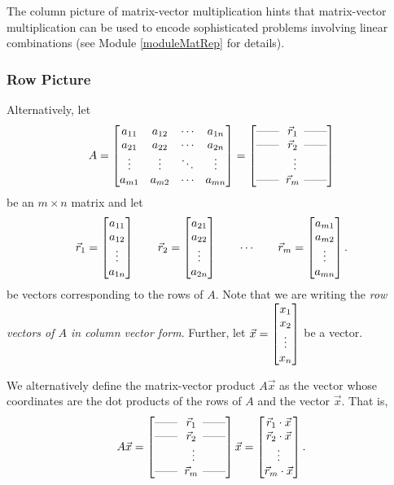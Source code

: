 The column picture of matrix-vector multiplication hints that matrix-vector multiplication can be used
to encode sophisticated problems involving linear combinations (see Module \ref{moduleMatRep} for details).

\subsubsection*{Row Picture}

\newcommand{\hdash}{\text{\-------}}
Alternatively, let
\[
	A=
	\matc{
				{a_{11}} & {a_{12}} & {\cdots} & {a_{1n}}\\
				{a_{21}} & {a_{22}} & {\cdots} & {a_{2n}}\\
				{\vdots} & {\vdots} & {\ddots} & {\vdots}\\
				{a_{m1}} & {a_{m2}} & {\cdots} & {a_{mn}}
				}=
			\matc{\hdash&\hspace{-4pt}\vec r_1&\hspace{-6pt}\hdash\\
				\hdash&\hspace{-4pt}\vec r_2&\hspace{-6pt}\hdash\\
				&\vdots&\\
				\hdash&\hspace{-4pt}\vec r_m&\hspace{-6pt}\hdash}
\]
be an $m\times n$ matrix and let 
\[
	\vec r_1=\begin{bmatrix}a_{11}\\a_{12}\\\vdots\\a_{1n}\end{bmatrix}\qquad
	\vec r_2=\begin{bmatrix}a_{21}\\a_{22}\\\vdots\\a_{2n}\end{bmatrix}\qquad\cdots\qquad
	\vec r_m=\begin{bmatrix}a_{m1}\\a_{m2}\\\vdots\\a_{mn}\end{bmatrix}.
\]
be vectors corresponding to the rows of $A$. Note that we are writing the \emph{row vectors of $A$ in column vector form}. 
Further, let $\vec x=\begin{bmatrix}x_1\\x_2\\\vdots\\x_n\end{bmatrix}$ be a vector.

We alternatively define the matrix-vector product $A\vec x$ as the vector whose coordinates are the dot products of the
rows of $A$ and the vector $\vec x$. That is,
\[
	A\vec x =
			\matc{\hdash&\hspace{-4pt}\vec r_1&\hspace{-6pt}\hdash\\
				\hdash&\hspace{-4pt}\vec r_2&\hspace{-6pt}\hdash\\
				&\vdots&\\
				\hdash&\hspace{-4pt}\vec r_m&\hspace{-6pt}\hdash}
			\vec x
		=
	\matc{\vec r_1\cdot \vec x\\\vec r_2\cdot\vec x\\\vdots\\\vec r_m\cdot \vec x}.
\]


